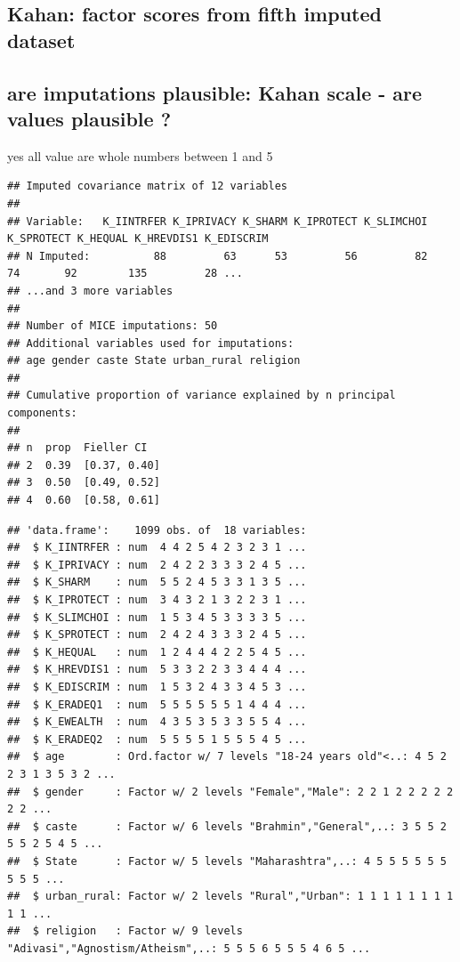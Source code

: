 \documentclass[
]{article}
\begin{document}
\hypertarget{kahan-factor-scores-from-fifth-imputed-dataset}{%
\subsection{Kahan: factor scores from fifth imputed
dataset}\label{kahan-factor-scores-from-fifth-imputed-dataset}}

\hypertarget{are-imputations-plausible-kahan-scale---are-values-plausible}{%
\subsection{are imputations plausible: Kahan scale - are values
plausible
?}\label{are-imputations-plausible-kahan-scale---are-values-plausible}}

yes all value are whole numbers between 1 and 5

\begin{verbatim}
## Imputed covariance matrix of 12 variables
## 
## Variable:   K_IINTRFER K_IPRIVACY K_SHARM K_IPROTECT K_SLIMCHOI K_SPROTECT K_HEQUAL K_HREVDIS1 K_EDISCRIM 
## N Imputed:          88         63      53         56         82         74       92        135         28 ...
## ...and 3 more variables
## 
## Number of MICE imputations: 50
## Additional variables used for imputations:
## age gender caste State urban_rural religion
## 
## Cumulative proportion of variance explained by n principal components:
## 
## n  prop  Fieller CI    
## 2  0.39  [0.37, 0.40]  
## 3  0.50  [0.49, 0.52]  
## 4  0.60  [0.58, 0.61]
\end{verbatim}

\begin{verbatim}
## 'data.frame':    1099 obs. of  18 variables:
##  $ K_IINTRFER : num  4 4 2 5 4 2 3 2 3 1 ...
##  $ K_IPRIVACY : num  2 4 2 2 3 3 3 2 4 5 ...
##  $ K_SHARM    : num  5 5 2 4 5 3 3 1 3 5 ...
##  $ K_IPROTECT : num  3 4 3 2 1 3 2 2 3 1 ...
##  $ K_SLIMCHOI : num  1 5 3 4 5 3 3 3 3 5 ...
##  $ K_SPROTECT : num  2 4 2 4 3 3 3 2 4 5 ...
##  $ K_HEQUAL   : num  1 2 4 4 4 2 2 5 4 5 ...
##  $ K_HREVDIS1 : num  5 3 3 2 2 3 3 4 4 4 ...
##  $ K_EDISCRIM : num  1 5 3 2 4 3 3 4 5 3 ...
##  $ K_ERADEQ1  : num  5 5 5 5 5 5 1 4 4 4 ...
##  $ K_EWEALTH  : num  4 3 5 3 5 3 3 5 5 4 ...
##  $ K_ERADEQ2  : num  5 5 5 5 1 5 5 5 4 5 ...
##  $ age        : Ord.factor w/ 7 levels "18-24 years old"<..: 4 5 2 2 3 1 3 5 3 2 ...
##  $ gender     : Factor w/ 2 levels "Female","Male": 2 2 1 2 2 2 2 2 2 2 ...
##  $ caste      : Factor w/ 6 levels "Brahmin","General",..: 3 5 5 2 5 5 2 5 4 5 ...
##  $ State      : Factor w/ 5 levels "Maharashtra",..: 4 5 5 5 5 5 5 5 5 5 ...
##  $ urban_rural: Factor w/ 2 levels "Rural","Urban": 1 1 1 1 1 1 1 1 1 1 ...
##  $ religion   : Factor w/ 9 levels "Adivasi","Agnostism/Atheism",..: 5 5 5 6 5 5 5 4 6 5 ...
\end{verbatim}
\end{document}
